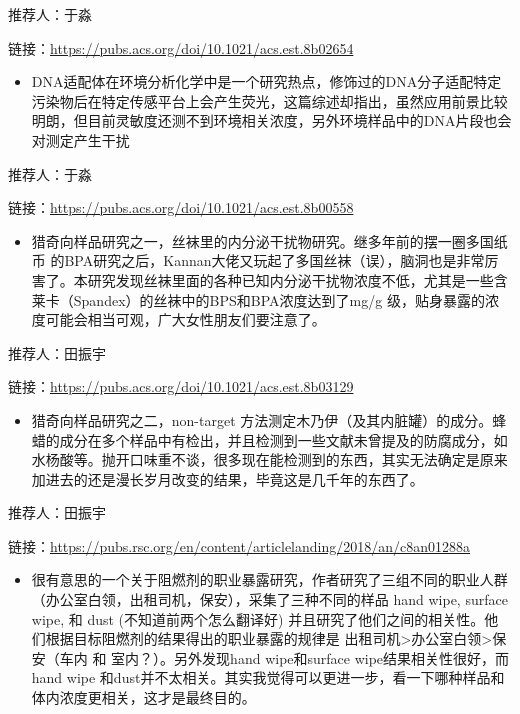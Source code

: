 \documentclass[]{book}
\providecommand{\tightlist}{%
  \setlength{\itemsep}{0pt}\setlength{\parskip}{0pt}}
\begin{document}
推荐人：于淼

链接：\url{https://pubs.acs.org/doi/10.1021/acs.est.8b02654}

\begin{itemize}
\tightlist
\item
  DNA适配体在环境分析化学中是一个研究热点，修饰过的DNA分子适配特定污染物后在特定传感平台上会产生荧光，这篇综述却指出，虽然应用前景比较明朗，但目前灵敏度还测不到环境相关浓度，另外环境样品中的DNA片段也会对测定产生干扰
\end{itemize}

推荐人：于淼

链接：\url{https://pubs.acs.org/doi/10.1021/acs.est.8b00558}

\begin{itemize}
\tightlist
\item
  猎奇向样品研究之一，丝袜里的内分泌干扰物研究。继多年前的摆一圈多国纸币
  的BPA研究之后，Kannan大佬又玩起了多国丝袜（误），脑洞也是非常厉害了。本研究发现丝袜里面的各种已知内分泌干扰物浓度不低，尤其是一些含莱卡（Spandex）的丝袜中的BPS和BPA浓度达到了mg/g
  级，贴身暴露的浓度可能会相当可观，广大女性朋友们要注意了。
\end{itemize}

推荐人：田振宇

链接：\url{https://pubs.acs.org/doi/10.1021/acs.est.8b03129}

\begin{itemize}
\tightlist
\item
  猎奇向样品研究之二，non-target
  方法测定木乃伊（及其内脏罐）的成分。蜂蜡的成分在多个样品中有检出，并且检测到一些文献未曾提及的防腐成分，如水杨酸等。抛开口味重不谈，很多现在能检测到的东西，其实无法确定是原来加进去的还是漫长岁月改变的结果，毕竟这是几千年的东西了。
\end{itemize}

推荐人：田振宇

链接：\url{https://pubs.rsc.org/en/content/articlelanding/2018/an/c8an01288a}

\begin{itemize}
\tightlist
\item
  很有意思的一个关于阻燃剂的职业暴露研究，作者研究了三组不同的职业人群（办公室白领，出租司机，保安），采集了三种不同的样品
  hand wipe, surface wipe, 和 dust (不知道前两个怎么翻译好)
  并且研究了他们之间的相关性。他们根据目标阻燃剂的结果得出的职业暴露的规律是
  出租司机\textgreater{}办公室白领\textgreater{}保安（车内 和
  室内？）。另外发现hand wipe和surface wipe结果相关性很好，而hand wipe
  和dust并不太相关。其实我觉得可以更进一步，看一下哪种样品和体内浓度更相关，这才是最终目的。
\end{itemize}
\end{document}

